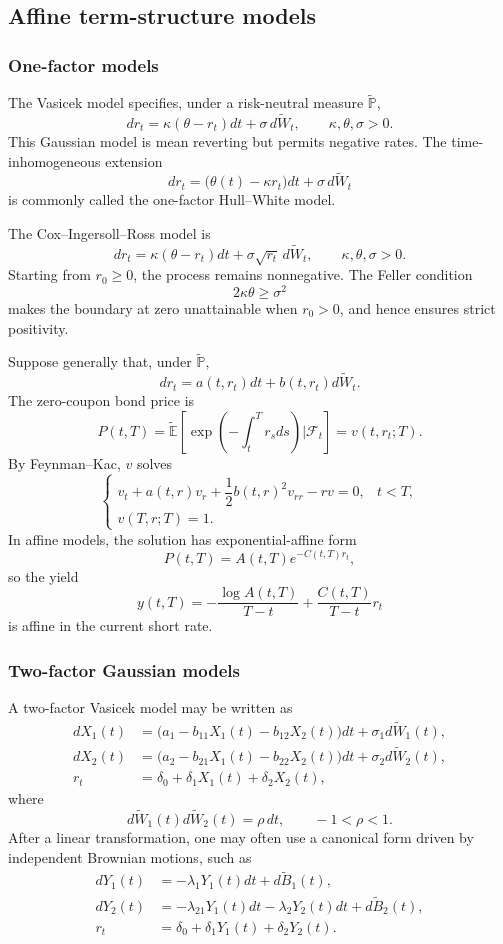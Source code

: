 \subsection{Affine term-structure models}

\subsubsection*{One-factor models}

The Vasicek model specifies, under a risk-neutral measure $\widetilde{\mathbb{P}}$,
\[
dr_t=\kappa(\theta-r_t)dt+\sigma\,d\widetilde W_t,
\qquad
\kappa,\theta,\sigma>0.
\]
This Gaussian model is mean reverting but permits negative rates. The time-inhomogeneous extension
\[
dr_t=\bigl(\theta(t)-\kappa r_t\bigr)dt+\sigma\,d\widetilde W_t
\]
is commonly called the one-factor Hull--White model.

The Cox--Ingersoll--Ross model is
\[
dr_t=\kappa(\theta-r_t)dt+\sigma\sqrt{r_t}\,d\widetilde W_t,
\qquad
\kappa,\theta,\sigma>0.
\]
Starting from $r_0\geq0$, the process remains nonnegative. The Feller condition
\[
2\kappa\theta\geq\sigma^2
\]
makes the boundary at zero unattainable when $r_0>0$, and hence ensures strict positivity.

Suppose generally that, under $\widetilde{\mathbb{P}}$,
\[
dr_t=a(t,r_t)dt+b(t,r_t)d\widetilde W_t.
\]
The zero-coupon bond price is
\[
P(t,T)
=\widetilde{\mathbb{E}}\!\left[
 \exp\!\left(-\int_t^Tr_sds\right)
 \bigg|\mathcal{F}_t
\right]
=v(t,r_t;T).
\]
By Feynman--Kac, $v$ solves
\[
\begin{cases}
 v_t+a(t,r)v_r+\dfrac12b(t,r)^2v_{rr}-rv=0,
    & t<T,\\[4pt]
 v(T,r;T)=1.
\end{cases}
\]
In affine models, the solution has exponential-affine form
\[
P(t,T)=A(t,T)e^{-C(t,T)r_t},
\]
so the yield
\[
y(t,T)
=-\frac{\log A(t,T)}{T-t}
 +\frac{C(t,T)}{T-t}r_t
\]
is affine in the current short rate.

\subsubsection*{Two-factor Gaussian models}

A two-factor Vasicek model may be written as
\[
\begin{aligned}
dX_1(t)
&=\bigl(a_1-b_{11}X_1(t)-b_{12}X_2(t)\bigr)dt
 +\sigma_1d\widetilde W_1(t),\\
dX_2(t)
&=\bigl(a_2-b_{21}X_1(t)-b_{22}X_2(t)\bigr)dt
 +\sigma_2d\widetilde W_2(t),\\
r_t&=\delta_0+\delta_1X_1(t)+\delta_2X_2(t),
\end{aligned}
\]
where
\[
d\widetilde W_1(t)d\widetilde W_2(t)=\rho\,dt,
\qquad -1<\rho<1.
\]
After a linear transformation, one may often use a canonical form driven by independent Brownian motions, such as
\[
\begin{aligned}
dY_1(t)&=-\lambda_1Y_1(t)dt+d\widetilde B_1(t),\\
dY_2(t)&=-\lambda_{21}Y_1(t)dt-\lambda_2Y_2(t)dt+d\widetilde B_2(t),\\
r_t&=\delta_0+\delta_1Y_1(t)+\delta_2Y_2(t).
\end{aligned}
\]

